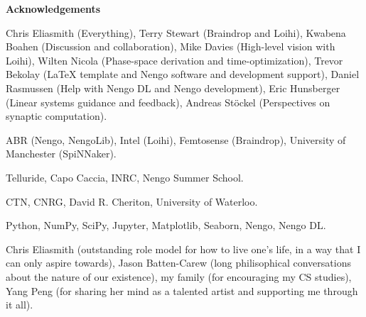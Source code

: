{}
\begin{center}\textbf{Acknowledgements}\end{center}

Chris Eliasmith (Everything),
Terry Stewart (Braindrop and Loihi),
Kwabena Boahen (Discussion and collaboration),
Mike Davies (High-level vision with Loihi),
Wilten Nicola (Phase-space derivation and time-optimization),
Trevor Bekolay (\LaTeX{} template and Nengo software and development support),
Daniel Rasmussen (Help with Nengo DL and Nengo development),
Eric Hunsberger (Linear systems guidance and feedback),
Andreas St\"ockel (Perspectives on synaptic computation).

ABR (Nengo, NengoLib), Intel (Loihi), Femtosense (Braindrop), University of Manchester (SpiNNaker).

Telluride, Capo Caccia, INRC, Nengo Summer School.

CTN, CNRG, David R. Cheriton, University of Waterloo.

Python, NumPy, SciPy, Jupyter, Matplotlib, Seaborn, Nengo, Nengo DL.

Chris Eliasmith (outstanding role model for how to live one's life, in a way that I can only aspire towards),
Jason Batten-Carew (long philisophical conversations about the nature of our existence),
my family (for encouraging my CS studies),
Yang Peng (for sharing her mind as a talented artist and supporting me through it all).

\cleardoublepage
